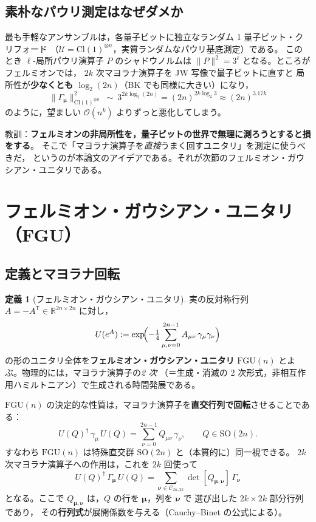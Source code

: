 \documentclass[11pt,a4paper]{ltjsarticle}
\newcommand{\R}{\mathbb{R}}
\newcommand{\Uc}{\mathcal{U}}
\newcommand{\Cc}{\mathcal{C}}
\newcommand{\FGU}{\mathrm{FGU}}
\newcommand{\SO}{\mathrm{SO}}
\newcommand{\Cl}{\mathrm{Cl}}
\theoremstyle{definition}
\newtheorem{teigi}{定義}[section]
\theoremstyle{plain}
\begin{document}
\subsection{素朴なパウリ測定はなぜダメか}
最も手軽なアンサンブルは，各量子ビットに独立なランダム 1 量子ビット・クリフォード
（$\Uc=\Cl(1)^{\otimes n}$，実質ランダムなパウリ基底測定）である。
このとき $\ell$-局所パウリ演算子 $P$ のシャドウノルムは
$\|P\|^2=3^{\ell}$ となる。ところがフェルミオンでは，
$2k$ 次マヨラナ演算子を JW 写像で量子ビットに直すと
局所性が\textbf{少なくとも $\log_2(2n)$}（BK でも同様に大きい）になり，
\[
  \|\Gamma_{\bm\mu}\|^2_{\Cl(1)^{\otimes n}}
  \ \sim\ 3^{2k\log_2(2n)}=(2n)^{2k\log_2 3}\approx (2n)^{3.17k}
\]
のように，望ましい $\mathcal O(n^k)$ よりずっと悪化してしまう。
\begin{ideabox}
教訓：\textbf{フェルミオンの非局所性を，量子ビットの世界で無理に測ろうとすると損をする}。
そこで「マヨラナ演算子を\emph{直接}うまく回すユニタリ」を測定に使うべきだ，
というのが本論文のアイデアである。それが次節のフェルミオン・ガウシアン・ユニタリである。
\end{ideabox}

\section{フェルミオン・ガウシアン・ユニタリ（FGU）}\label{sec:fgu}

\subsection{定義とマヨラナ回転}
\begin{teigi}[フェルミオン・ガウシアン・ユニタリ]
実の反対称行列 $A=-A^{\mathsf T}\in\R^{2n\times 2n}$ に対し，
\begin{equation}
  U(e^{A}):=\exp\!\Bigl(-\tfrac14\sum_{\mu,\nu=0}^{2n-1}A_{\mu\nu}\,
      \gamma_\mu\gamma_\nu\Bigr)
  \label{eq:FGUdef}
\end{equation}
の形のユニタリ全体を\textbf{フェルミオン・ガウシアン・ユニタリ}
$\FGU(n)$ とよぶ。物理的には，マヨラナ演算子の\emph{2 次}
（＝生成・消滅の 2 次形式，非相互作用ハミルトニアン）で生成される時間発展である。
\end{teigi}

$\FGU(n)$ の決定的な性質は，マヨラナ演算子を\textbf{直交行列で回転}させることである：
\begin{equation}
  U(Q)^\dagger\,\gamma_\mu\,U(Q)=\sum_{\nu=0}^{2n-1}Q_{\mu\nu}\,\gamma_\nu,
  \qquad Q\in\SO(2n).
  \label{eq:adjoint}
\end{equation}
すなわち $\FGU(n)$ は特殊直交群 $\SO(2n)$ と（本質的に）同一視できる。
$2k$ 次マヨラナ演算子への作用は，これを $2k$ 回使って
\begin{equation}
  U(Q)^\dagger\,\Gamma_{\bm\mu}\,U(Q)=\sum_{\bm\nu\in\Cc_{2n,2k}}
     \det[Q_{\bm\mu,\bm\nu}]\,\Gamma_{\bm\nu}
  \label{eq:adjoint2k}
\end{equation}
となる。ここで $Q_{\bm\mu,\bm\nu}$ は，$Q$ の行を $\bm\mu$，列を $\bm\nu$ で
選び出した $2k\times2k$ 部分行列であり，
その\textbf{行列式}が展開係数を与える（Cauchy--Binet の公式による）。
\end{document}

